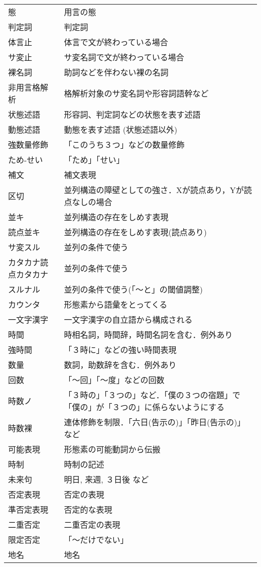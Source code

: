 \documentclass[a4j]{jarticle}
\begin{document}
\begin{supertabular}{p{4.2cm}p{9.6cm}}
態 & 用言の態\\
判定詞 & 判定詞\\
体言止 & 体言で文が終わっている場合\\
サ変止 & サ変名詞で文が終わっている場合\\
裸名詞 & 助詞などを伴わない裸の名詞\\
非用言格解析 & 格解析対象のサ変名詞や形容詞語幹など\\
状態述語 & 形容詞、判定詞などの状態を表す述語\\
動態述語 & 動態を表す述語 (状態述語以外)\\
強数量修飾 & 「このうち３つ」などの数量修飾\\
ため-せい & 「ため」「せい」\\
補文 & 補文表現\\
区切 & 並列構造の障壁としての強さ．Xが読点あり，Yが読点なしの場合\\
並キ & 並列構造の存在をしめす表現\\
読点並キ & 並列構造の存在をしめす表現(読点あり)\\
サ変スル &         並列の条件で使う\\
カタカナ読点カタカナ &  並列の条件で使う\\
スルナル &         並列の条件で使う(「〜と」の閾値調整)\\
カウンタ & 形態素から語彙をとってくる \\
一文字漢字 & 一文字漢字の自立語から構成される\\
時間 & 時相名詞，時間辞，時間名詞を含む．例外あり\\
強時間 & 「３時に」などの強い時間表現\\
数量 & 数詞，助数辞を含む．例外あり\\
回数 & 「〜回」「〜度」などの回数\\
時数ノ & 「３時の」「３つの」など．「僕の３つの宿題」で「僕の」が「３つの」に係らないようにする\\
時数裸 & 連体修飾を制限．「六日(告示の)」「昨日(告示の)」など\\
可能表現 & 形態素の可能動詞から伝搬\\
時制 & 時制の記述\\
未来句 & 明日, 来週, ３日後 など\\
否定表現 & 否定の表現\\
準否定表現 & 否定的な表現\\
二重否定 & 二重否定の表現\\
限定否定 & 「〜だけでない」\\
地名 & 地名 \\

\end{supertabular}
\end{document}
